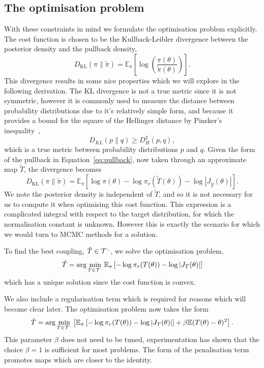\documentclass[final]{siamltex}
\newcommand{\ltri}{%
\,\resizebox{!}{0.25\baselineskip}{%
\begin{tikzpicture}%
\draw[line width=1mm](0,0) -- (0,2) -- (2,0)  -- (0,0);
\end{tikzpicture}%
}\xspace%
}%
\newcommand{\smallltri}{%
\,\resizebox{!}{0.15\baselineskip}{%
\begin{tikzpicture}%
\draw[line width=1mm](0,0) -- (0,2) -- (2,0)  -- (0,0);
\end{tikzpicture}%
}\xspace%
}%
\begin{document}
\subsection{The optimisation problem}

With these constraints in mind we formulate the optimisation problem explicitly. The cost function
is chosen to be the Kullback-Leibler divergence between the posterior density and the pullback density,
\[
	D_\text{KL}(\pi\|\tilde{\pi}) =
		\mathbb{E}_\pi\left[\log\left(\frac{\pi(\theta)}{\tilde{\pi}(\theta)}\right)\right].
\]
This divergence results in some nice properties which we will explore in the following derivation. The KL divergence is not a true metric since it is not symmetric, however it is commonly used to measure the distance between probability distributions due to it's relatively simple form, and because it provides a bound for the square of the Hellinger distance by Pinsker's inequality~\cite{pinsker1960information},
\[
	D_{KL}(p\|q) \geq D_H^2(p,q),
\]
which is a true metric between probability distributions $p$ and $q$.
Given the form of the pullback in Equation~\eqref{eq:pullback}, now taken through an approximate map $\tilde{T}$, the divergence becomes
\[
	D_\text{KL}(\pi\|\tilde{\pi}) = \mathbb{E}_\pi\left[\log\pi(\theta) - \log\pi_r(\tilde{T}(\theta)) -
		\log\left|J_{\tilde{T}}(\theta)\right|\right].
\]
We note the posterior density is independent of $\tilde{T}$, and so it is not necessary for us to compute it when optimising this cost function. This expression is a complicated integral with respect to the target distribution, for which the normalisation constant is unknown. However this is exactly the scenario for which we would turn to MCMC methods for a solution.

To find the best coupling, $\tilde{T} \in \mathcal{T}^{\ltri}$, we solve the optimisation problem,
\[
	\tilde{T} = \arg\min_{T \in \mathcal{T}^{\smallltri}} \mathbb{E}_\pi\left[-\log\pi_r(T(\theta)) -
		\log\left|J_T(\theta)\right|\right]
\]
which has a unique solution since the cost function is convex.

We also include a regularisation term which is required for reasons which will become clear later. The optimisation problem now takes the form
\begin{equation}\label{eq:gen_map_optim}
	\tilde{T} = \arg\min_{T\in\mathcal{T}^{\smallltri}} \left[
		 \mathbb{E}_\pi\left[-\log\pi_r(T(\theta)) -
		\log\left|J_T(\theta)\right|\right] + \beta\mathbb{E}(T(\theta)- \theta)^2 \right].
\end{equation}
This parameter $\beta$ does not need to be tuned, experimentation has shown that the choice
$\beta=1$ is sufficient for most problems. The form of the penalisation term promotes maps which are
closer to the identity.
\end{document}
